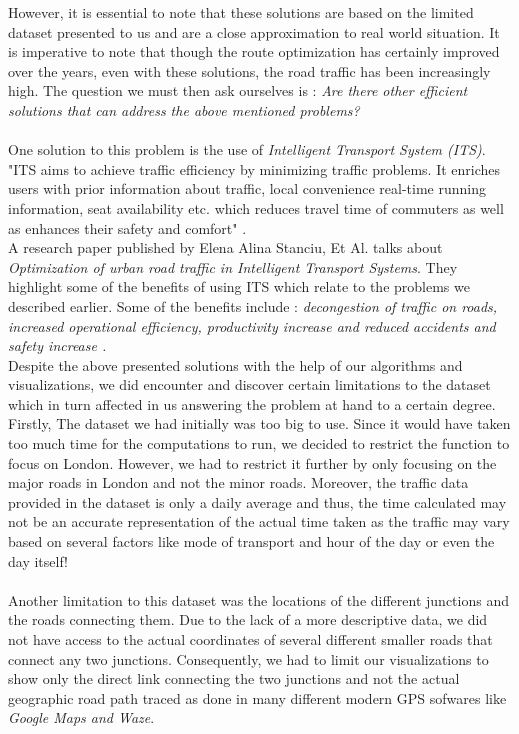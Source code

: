 \documentclass[fontsize=11pt]{IEEEtran}
\begin{document}
However, it is essential to note that these solutions are based on the limited dataset presented to us and are a close approximation to real world situation. It is imperative to note that though the route optimization has certainly improved over the years, even with these solutions, the road traffic has been increasingly high. The question we must then ask ourselves is : \textit{Are there other efficient solutions that can address the above mentioned problems?}  \\ \\
One solution to this problem is the use of \textit{Intelligent Transport System (ITS)}. "ITS aims to achieve traffic efficiency by minimizing traffic problems. It enriches users with prior information about traffic, local convenience real-time running information, seat availability etc. which reduces travel time of commuters as well as enhances their safety and comfort" \cite{11}. \\

\indent A research paper published by Elena Alina Stanciu, Et Al. talks about \textit{Optimization of urban road traffic in Intelligent Transport Systems}. They highlight some of the benefits of using ITS which relate to the problems we described earlier. Some of the benefits include :\textit{ decongestion of traffic on roads, increased operational efficiency, productivity increase and reduced accidents and safety increase \cite{12} .}
\\

Despite the above presented solutions with the help of our algorithms and visualizations, we did encounter and discover certain limitations to the dataset which in turn affected in us answering the problem at hand to a certain degree. Firstly, The dataset we had initially was too big to use. Since it would have taken too much time for the computations to run, we decided to restrict the function to focus on London. However, we had to restrict it further by only focusing on the major roads in London and not the minor roads. Moreover, the traffic data provided in the dataset is only a daily average and thus, the time calculated may not be an accurate representation of the actual time taken as the traffic may vary based on several factors like mode of transport and hour of the day or even the day itself!\\ \\
\indent Another limitation to this dataset was the locations of the different junctions and the roads connecting them. Due to the lack of a more descriptive data, we did not have access to the actual coordinates of several different smaller roads that connect any two junctions. Consequently, we had to limit our visualizations to show only the direct link connecting the two junctions and not the actual geographic road path traced as done in many different modern GPS sofwares like \textit{Google Maps and Waze}. \\
\end{document}
